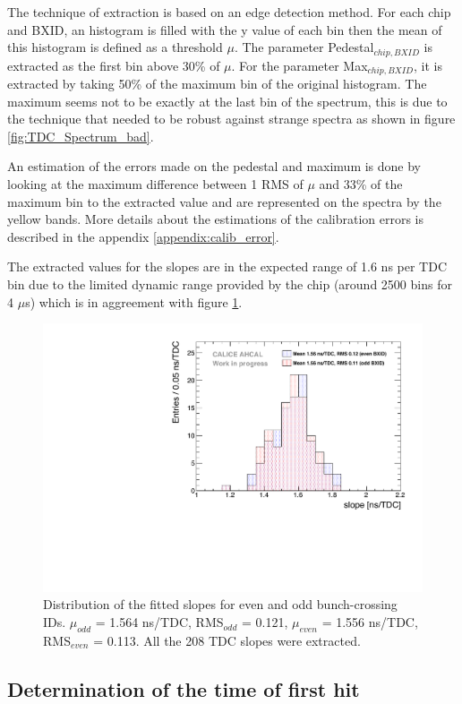 The technique of extraction is based on an edge detection method. For each chip and BXID, an histogram is filled with the y value of each bin then the mean of this histogram is defined as a threshold $\mu$. The parameter Pedestal$_{chip, BXID}$ is extracted as the first bin above 30\% of $\mu$. For the parameter Max$_{chip, BXID}$, it is extracted by taking 50\% of the maximum bin of the original histogram. The maximum seems not to be exactly at the last bin of the spectrum, this is due to the technique that needed to be robust against strange spectra as shown in figure \ref{fig:TDC_Spectrum_bad}.

An estimation of the errors made on the pedestal and maximum is done by looking at the maximum difference between 1 RMS of $\mu$ and 33\% of the maximum bin to the extracted value and are represented on the spectra by the yellow bands. More details about the estimations of the calibration errors is described in the appendix \ref{appendix:calib_error}.

The extracted values for the slopes are in the expected range of 1.6 ns per TDC bin due to the limited dynamic range provided by the chip (around 2500 bins for 4 $\mu$s) which is in aggreement with figure \ref{fig:slope_time}.

\begin{figure}[htbp!]
	\centering
	\includegraphics[width=0.7\linewidth]{chap5/fig_AHCAL_timing/Muons/SlopesTDC}
	\caption{Distribution of the fitted slopes for even and odd bunch-crossing IDs. $\mu_{odd}$ = 1.564 ns/TDC, RMS$_{odd}$ = 0.121, $\mu_{even}$ = 1.556 ns/TDC, RMS$_{even}$ = 0.113. All the 208 TDC slopes were extracted.} \label{fig:slope_time}
\end{figure}

\subsection{Determination of the time of first hit}

